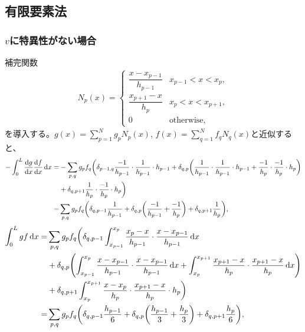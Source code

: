 \documentclass[xelatex,ja=standard]{bxjsarticle}
\begin{document}
\subsection{有限要素法}
\subsubsection{$v$に特異性がない場合}
補完関数
\begin{align}
    N_p(x) = 
    \begin{cases}
        \dfrac{x-x_{p-1}}{h_{p-1}}&x_{p-1}<x<x_p,\\
        \dfrac{x_{p+1} - x}{h_p}&x_{p}<x<x_{p+1},\\
        0&\text{otherwise},
    \end{cases}
\end{align}
を導入する。$g(x) = \sum_{p=1}^N g_pN_p(x)$, $f(x) = \sum_{q=1}^N f_qN_q(x)$と近似すると、
\begin{align}
    -\int_0^L \dv{g}{x}\dv{f}{x}\dd{x}
     =& -\sum_{p, q}g_pf_q\bigg(\delta_{p - 1, q}\dfrac{-1}{h_{p-1}}\cdot\dfrac{1}{h_{p-1}}\cdot h_{p-1}
      + \delta_{q, p}\qty(\dfrac{1}{h_{p-1}}\cdot\dfrac{1}{h_{p-1}}\cdot h_{p-1} + \dfrac{-1}{h_{p}}\cdot\dfrac{-1}{h_{p}}\cdot h_{p})\notag\\
      &+ \delta_{q, p + 1}\dfrac{1}{h_{p}}\cdot\dfrac{-1}{h_{p}}\cdot h_{p}
      \bigg)\notag\\
     =& \sum_{p, q}g_pf_q\bigg(\delta_{q, p - 1}\dfrac{1}{h_{p-1}}
      + \delta_{q, p}\qty(\dfrac{-1}{h_{p-1}} + \dfrac{-1}{h_{p}})+ \delta_{q, p + 1}\dfrac{1}{h_{p}}
      \bigg),
\end{align}
\begin{align}
    \int_0^L gf\dd{x}
     =& \sum_{p, q}g_pf_q\bigg(\delta_{q, p - 1}\int_{x_{p-1}}^{x_p}\dfrac{x_{p} - x}{h_{p-1}}\cdot\dfrac{x-x_{p-1}}{h_{p-1}}\dd{x}\notag\\
      &+ \delta_{q, p}\qty(\int_{x_{p-1}}^{x_p}\dfrac{x-x_{p-1}}{h_{p-1}}\cdot\dfrac{x-x_{p-1}}{h_{p-1}}\dd{x}
       + \int_{x_{p}}^{x_{p+1}}\dfrac{x_{p+1} - x}{h_{p}}\cdot\dfrac{x_{p+1} - x}{h_{p}}\dd{x})\notag\\
      &+ \delta_{q, p + 1}\int_{x_{p}}^{x_{p+1}}\dfrac{x-x_{p}}{h_{p}}\cdot\dfrac{x_{p+1} -x}{h_{p}}\cdot h_{p}
      \bigg)\notag\\
      =& \sum_{p, q}g_pf_q\bigg(\delta_{q, p - 1}\dfrac{h_{p-1}}{6}
      + \delta_{q, p}\qty(\dfrac{h_{p-1}}{3} + \dfrac{h_{p}}{3})+ \delta_{q, p + 1}\dfrac{h_{p}}{6}\bigg),
\end{align}
\end{document}
